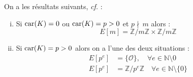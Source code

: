 \documentclass[a4paper]{article} %
\numberwithin{section}{part}
\numberwithin{equation}{section}
\newcommand\zmodn[1]{\mathbb{Z}/#1\mathbb{Z}}
\newcommand\NN{\mathbb{N}}
\newcommand\EO{\mathcal{O}}
\begin{document}
On a les résultats suivants, \emph{cf.} \cite[Cor. 6.4]{Sil}:
\vspace{0.3cm}
\begin{enumerate}[(i)]
\item Si $\textup{car}(K) = 0$ ou $\textup{car}(K) = p > 0$ et $p\nmid\,m$ 
alors :
\begin{equation}
E[m] = \zmodn{m}\times\zmodn{m}
\end{equation}
\item Si $\textup{car}(K) = p > 0$ alors on a l'une des deux situations :
    \begin{align} 
    E[p^e] &= \lbrace{\EO}\rbrace, \quad \forall
e\in\NN\setminus{0}\label{eq:supersingcurv}\\
    E[p^e] &= \zmodn{p^e}\quad \forall e\in\NN\setminus\lbrace{0}\rbrace
    \end{align}
\end{enumerate}
\vspace{0.3cm}
\end{document}
